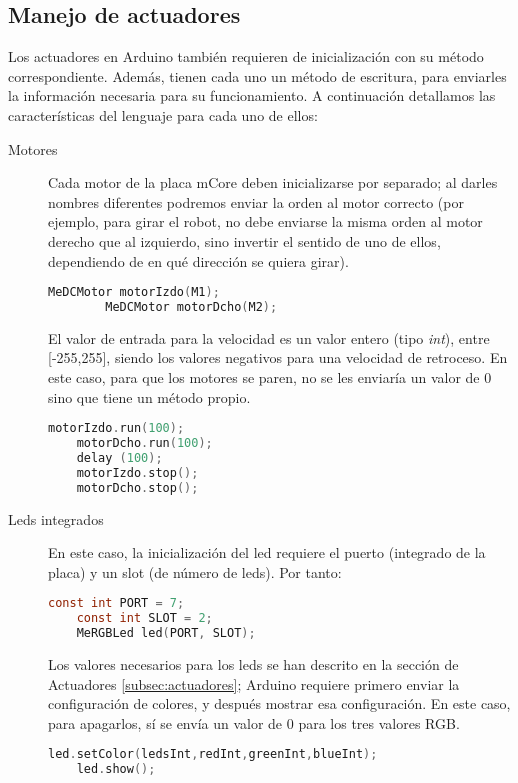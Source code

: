 \subsection{Manejo de actuadores}\label{subsec:actuadoresArduino}
Los actuadores en Arduino también requieren de inicialización con su método correspondiente. Además, tienen cada uno un método de escritura, para enviarles la información necesaria para su funcionamiento. A continuación detallamos las características del lenguaje para cada uno de ellos:

\begin{description}
	\item [Motores] Cada motor de la placa mCore deben inicializarse por separado; al darles nombres diferentes podremos enviar la orden al motor correcto (por ejemplo, para girar el robot, no debe enviarse la misma orden al motor derecho que al izquierdo, sino invertir el sentido de uno de ellos, dependiendo de en qué dirección se quiera girar). 
	\begin{lstlisting}[language=C,caption={Inicializar motores Mbot}]	
		MeDCMotor motorIzdo(M1);
		MeDCMotor motorDcho(M2);	
	\end{lstlisting}
	El valor de entrada para la velocidad es un valor entero (tipo \textit{int}), entre [-255,255], siendo los valores negativos para una velocidad de retroceso. En este caso, para que los motores se paren, no se les enviaría un valor de 0 sino que tiene un método propio.	
	\begin{lstlisting}[language=C,caption={Uso de motores Mbot}]		
	motorIzdo.run(100);
	motorDcho.run(100);
	delay (100);
	motorIzdo.stop();
	motorDcho.stop();	
	\end{lstlisting}

	\item [Leds integrados]  En este caso, la inicialización del led requiere el puerto (integrado de la placa) y un slot (de número de leds). Por tanto:
	\begin{lstlisting}[language=C,caption={Inicializar leds}]	
	const int PORT = 7;
	const int SLOT = 2;
	MeRGBLed led(PORT, SLOT);	
	\end{lstlisting}
	Los valores necesarios para los leds se han descrito en la sección de Actuadores \ref{subsec:actuadores}; Arduino requiere primero enviar la configuración de colores, y después mostrar esa configuración. En este caso, para apagarlos, sí se envía un valor de 0 para los tres valores RGB.
	\begin{lstlisting}[language=C,caption={Uso de los leds}]	
	led.setColor(ledsInt,redInt,greenInt,blueInt);
	led.show();	
	\end{lstlisting}


\end{description}
